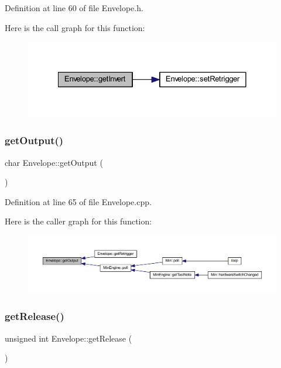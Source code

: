 Definition at line 60 of file Envelope.\+h.

Here is the call graph for this function\+:
\nopagebreak
\begin{figure}[H]
\begin{center}
\leavevmode
\includegraphics[width=328pt]{class_envelope_a90c62a0768be44808c1a1ea731ff1f7c_cgraph}
\end{center}
\end{figure}
\mbox{\label{class_envelope_a962be8de5485992477ef09c7038812b2}} 
\subsubsection{\texorpdfstring{get\+Output()}{getOutput()}}
{\footnotesize\ttfamily char Envelope\+::get\+Output (\begin{DoxyParamCaption}{ }\end{DoxyParamCaption})}



Definition at line 65 of file Envelope.\+cpp.

Here is the caller graph for this function\+:
\nopagebreak
\begin{figure}[H]
\begin{center}
\leavevmode
\includegraphics[width=350pt]{class_envelope_a962be8de5485992477ef09c7038812b2_icgraph}
\end{center}
\end{figure}
\mbox{\label{class_envelope_a96815367d569e8bdd8d5798475a0ab76}} 
\subsubsection{\texorpdfstring{get\+Release()}{getRelease()}}
{\footnotesize\ttfamily unsigned int Envelope\+::get\+Release (\begin{DoxyParamCaption}{ }\end{DoxyParamCaption})\hspace{0.3cm}{\ttfamily [inline]}}



